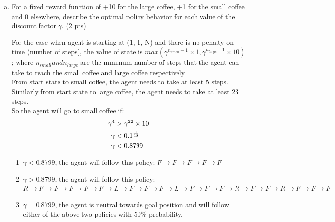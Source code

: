 \documentclass[12pt]{article}
\begin{document}
\begin{enumerate}[a)]
\item For a fixed reward function of +10 for the large coffee, +1 for the small coffee and 0 elsewhere, describe the optimal policy behavior for each value of the discount factor $\gamma$. (2 pts)

\begin{solution}
For the case  when agent is starting at (1, 1, N) and there is no penalty on time (number of steps), the value of state is $max(\gamma^{n_{small} -1} \times 1, \gamma^{n_{large} -1} \times 10)$; where $n_{small} and n_{large}$ are the minimum number of steps that the agent can take to reach the small coffee and large coffee respectively\\
From start state to small coffee, the agent needs to take at least 5 steps. Similarly from start state to large coffee, the agent needs to take at least 23 steps.\\
So the agent will go to small coffee if:
\begin{align} 
\gamma^4 \time 1 &> \gamma^{22} \times 10 \\
\gamma &< 0.1^{\frac{1}{18}}\\
\gamma &< 0.8799
\end{align}

\begin{enumerate}
\item $\gamma < 0.8799$, the agent will follow this policy: $F \rightarrow F \rightarrow F \rightarrow F \rightarrow F$
\item $\gamma > 0.8799$, the agent will follow this policy: $R \rightarrow F \rightarrow F \rightarrow F \rightarrow F \rightarrow F \rightarrow L \rightarrow F \rightarrow F \rightarrow F \rightarrow L \rightarrow F \rightarrow F \rightarrow F \rightarrow R \rightarrow F \rightarrow F \rightarrow R \rightarrow F \rightarrow F \rightarrow F$
\item $\gamma = 0.8799$, the agent is neutral towards goal position and will follow either of the above two policies with 50\% probability.
\end{enumerate}
\end{solution}

\begin{figure}[h]
  \centering
\end{figure}
\end{enumerate}
\end{document}
